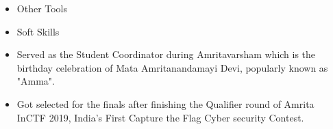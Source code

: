 \smallskip\smallskip

\begin{itemize}
    \item \textcolor{emphasis}{Other Tools} 
\end{itemize}

\smallskip\smallskip

\begin{itemize}
    \item \textcolor{emphasis}{Soft Skills} 
\end{itemize}




\begin{itemize}
    \item Served as the Student Coordinator during Amritavarsham which is the birthday celebration of Mata Amritanandamayi Devi, popularly known as "Amma".
    \item Got selected for the finals after finishing the Qualifier round of Amrita InCTF 2019, India’s First Capture the Flag Cyber security Contest.
\end{itemize}

